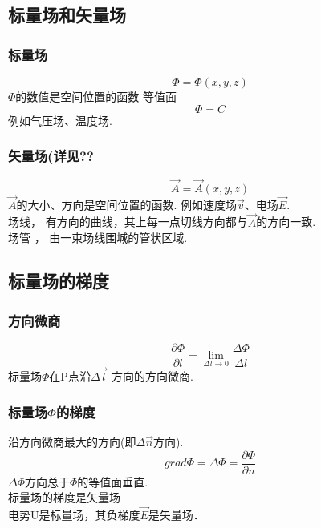 
\subsection{标量场和矢量场}
\subsubsection{标量场}
\begin{equation}\label{VecAnl_eq1}
\Phi=\Phi(x,y,z)
\end{equation}
 $\Phi$的数值是空间位置的函数
 等值面
\begin{equation}\label{VecAnl_eq2}
\Phi=C
\end{equation}
 例如气压场、温度场.
\subsubsection{矢量场(详见??}%
\begin{equation}\label{VecAnl_eq3}
\vec {A}= \vec{A}(x,y,z)
\end{equation}
$\vec{A}$的大小、方向是空间位置的函数.
例如速度场$\vec{v}$、电场$\vec{E}$.\\
\qquad 场线，
 有方向的曲线，其上每一点切线方向都与$\vec{A}$的方向一致.\\
\qquad 场管 ，
由一束场线围城的管状区域.

\subsection{标量场的梯度}%
\subsubsection{方向微商}
\begin{equation}\label{VecAnl_eq4}
\frac{\partial \Phi}{\partial l}=\lim_{\Delta l \to 0}\frac{\Delta \Phi}{\Delta l}
\end{equation}
标量场$\Phi$在P点沿$\Delta \vec{l} $ 方向的方向微商.

\subsubsection{标量场$\Phi$的梯度}
沿方向微商最大的方向(即$\Delta \vec{n}$方向).
\begin{equation}\label{VecAnl_eq5}
grad \Phi = \Delta \Phi =\frac{\partial \Phi}{\partial n}
\end{equation}
$\Delta \Phi$方向总于$\Phi$的等值面垂直.\\
标量场的梯度是矢量场\\
电势U是标量场，其负梯度$\vec{E}$是矢量场．

